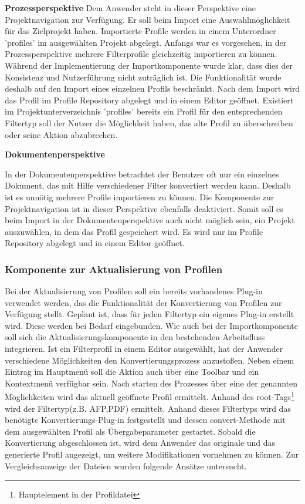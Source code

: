 {{{\textbf{Prozessperspektive}
 {Dem Anwender steht in dieser Perspektive eine Projektnavigation zur Verfügung. Er soll beim Import eine Auswahlmöglichkeit für das Zielprojekt haben. Importierte Profile werden in einem Unterordner 'profiles' im ausgewählten Projekt abgelegt. Anfangs war es vorgesehen, in der Prozessperspektive mehrere Filterprofile gleichzeitig importieren zu können. Während der Implementierung der Importkomponente wurde klar, dass dies der Konsistenz und Nutzerführung nicht zuträglich ist. Die Funktionalität wurde deshalb auf den Import eines einzelnen Profils beschränkt. Nach dem Import wird das Profil im Profile Repository abgelegt und in einem Editor geöffnet. Existiert im Projektunterverzeichnis 'profiles' bereits ein Profil für den entsprechenden Filtertyp soll der Nutzer die Möglichkeit haben, das alte Profil zu überschreiben oder seine Aktion abzubrechen. 
}


\textbf{Dokumentenperspektive} 
{In der Dokumentenperspektive betrachtet der Benutzer oft nur ein einzelnes Dokument, das mit Hilfe verschiedener Filter konvertiert werden kann. Deshalb ist es unnötig mehrere Profile importieren zu können. Die Komponente zur Projektnavigation ist in dieser Perspektive ebenfalls deaktiviert. Somit soll es beim Import in der Dokumentenperspektive auch nicht möglich sein, ein Projekt auszuwählen, in dem das Profil gespeichert wird. Es wird nur im Profile Repository abgelegt und in einem Editor geöffnet.


}



}

\subsubsection{Komponente zur Aktualisierung von Profilen}{
Bei der Aktualisierung von Profilen soll ein bereits vorhandenes Plug-in verwendet werden, das die Funktionalität der Konvertierung von Profilen zur Verfügung stellt. Geplant ist, dass für jeden Filtertyp ein eigenes Plug-in erstellt wird. Diese werden bei Bedarf eingebunden. Wie auch bei der Importkomponente soll sich die Aktualisierungskomponente in den bestehenden Arbeitsfluss integrieren. Ist ein Filterprofil in einem Editor ausgewählt, hat der Anwender verschiedene Möglichkeiten den Konvertierungsprozess anzustoßen. Neben einem Eintrag im Hauptmenü soll die Aktion auch über eine Toolbar und ein Kontextmenü verfügbar sein. Nach starten des Prozesses über eine der genannten Möglichkeiten wird das aktuell geöffnete Profil ermittelt. Anhand des root-Tags\footnote{Hauptelement in der Profildatei} wird der Filtertyp(z.B. \ac{AFP},\ac{PDF}) ermittelt. Anhand dieses Filtertyps wird das benötigte Konvertierungs-Plug-in festgestellt und dessen convert-Methode mit dem ausgewählten Profil als Übergabeparameter gestartet. Sobald die Konvertierung abgeschlossen ist, wird dem Anwender das originale und das generierte Profil angezeigt, um weitere Modifikationen vornehmen zu können. Zur Vergleichsanzeige der Dateien wurden folgende Ansätze untersucht.

}}}
